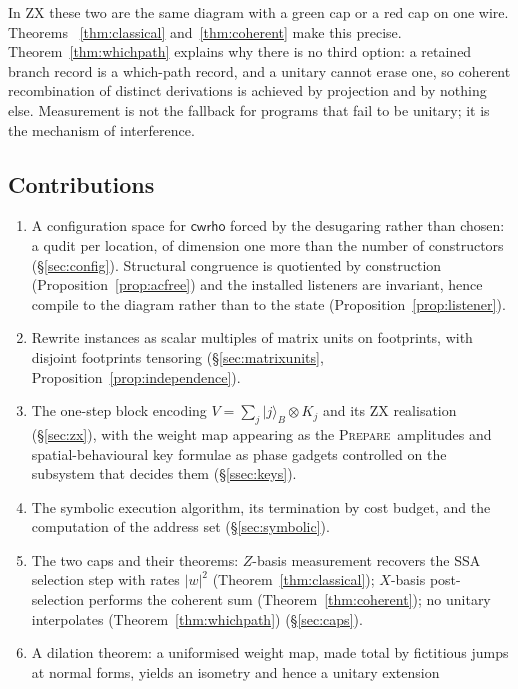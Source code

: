\documentclass[11pt]{article}
\theoremstyle{definition}
\theoremstyle{plain}
\newcommand{\PREP}{\textsc{Prepare}}
\newcommand{\ket}[1]{| #1 \rangle}
\newcommand{\cwrho}{\textsf{cwrho}}
\begin{document}
In ZX these two are the same diagram with a green cap or a red cap on one wire. Theorems~
\ref{thm:classical} and~\ref{thm:coherent} make this precise. Theorem~\ref{thm:whichpath}
explains why there is no third option: a retained branch record is a which-path record, and a
unitary cannot erase one, so coherent recombination of distinct derivations is achieved by
projection and by nothing else. Measurement is not the fallback for programs that fail to be
unitary; it is the mechanism of interference.

\subsection{Contributions}

\begin{enumerate}[leftmargin=*]
  \item A configuration space for $\cwrho$ forced by the desugaring rather than chosen: a
        qudit per location, of dimension one more than the number of constructors
        (\S\ref{sec:config}). Structural congruence is quotiented by construction
        (Proposition~\ref{prop:acfree}) and the installed listeners are invariant, hence
        compile to the diagram rather than to the state (Proposition~\ref{prop:listener}).
  \item Rewrite instances as scalar multiples of matrix units on footprints, with disjoint
        footprints tensoring (\S\ref{sec:matrixunits}, Proposition~\ref{prop:independence}).
  \item The one-step block encoding $V = \sum_j \ket{j}_B \otimes K_j$ and its ZX realisation
        (\S\ref{sec:zx}), with the weight map appearing as the \PREP\ amplitudes and
        spatial-behavioural key formulae as phase gadgets controlled on the subsystem that
        decides them (\S\ref{ssec:keys}).
  \item The symbolic execution algorithm, its termination by cost budget, and the computation
        of the address set (\S\ref{sec:symbolic}).
  \item The two caps and their theorems: $Z$-basis measurement recovers the SSA selection step
        with rates $|w|^2$ (Theorem~\ref{thm:classical}); $X$-basis post-selection performs the
        coherent sum (Theorem~\ref{thm:coherent}); no unitary interpolates
        (Theorem~\ref{thm:whichpath}) (\S\ref{sec:caps}).
  \item A dilation theorem: a uniformised weight map, made total by fictitious jumps at normal
        forms, yields an isometry and hence a unitary extension

\end{enumerate}
\end{document}
